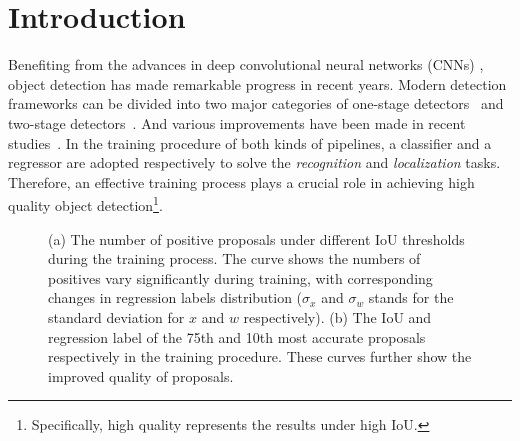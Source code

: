\documentclass[runningheads]{llncs}
\begin{document}
\section{Introduction}

Benefiting from the advances in deep convolutional neural networks (CNNs) \cite{AlexNet,VGG,ResNet,AP3D}, object detection has made remarkable progress in recent years. Modern detection frameworks can be divided into two major categories of one-stage detectors~\cite{YOLO,SSD,FocalLoss} and two-stage detectors~\cite{RCNN,FastRCNN,FasterRCNN}. And various improvements have been made in recent studies~\cite{FCOS,TridentNet,RepPoints,CascadeRetinaNet,NoisyAnchors,CornerNet,RFBNet,AlignDet,LSTS}.
In the training procedure of both kinds of pipelines, a classifier and a regressor are adopted respectively to solve the \textit{recognition} and \textit{localization} tasks. Therefore, an effective training process plays a crucial role in achieving high quality object detection\footnote[1]{Specifically, high quality represents the results under high IoU.}.


\begin{figure}[!t]
    \centering
    \caption{(a) The number of positive proposals under different IoU thresholds during the training process. The curve shows the numbers of positives vary significantly during training, with corresponding changes in regression labels distribution ($\sigma_x$ and $\sigma_w$ stands for the standard deviation for $x$ and $w$ respectively). (b) The IoU and regression label of the 75th and 10th most accurate proposals respectively in the training procedure. These curves further show the improved quality of proposals.
    }
    \label{fig:quantity}
\end{figure}
\end{document}
